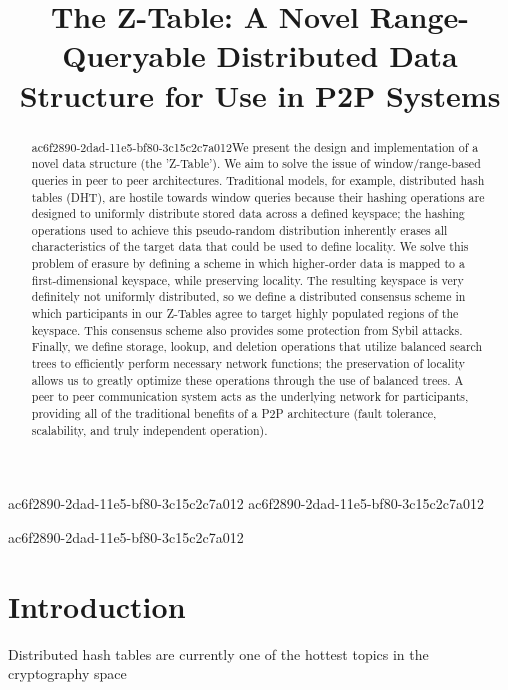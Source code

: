 \documentclass[12pt]{article}
\title{The Z-Table: A Novel Range-Queryable Distributed Data Structure for Use in P2P Systems}
\begin{document}
ac6f2890-2dad-11e5-bf80-3c15c2c7a012
ac6f2890-2dad-11e5-bf80-3c15c2c7a012\maketitle
ac6f2890-2dad-11e5-bf80-3c15c2c7a012
\begin{abstract}
ac6f2890-2dad-11e5-bf80-3c15c2c7a012We present the design and implementation of a novel data structure (the 'Z-Table'). We aim to solve the issue of window/range-based queries in peer to peer architectures. Traditional models, for example,  distributed hash tables (DHT), are hostile towards window queries because their hashing operations are designed to uniformly distribute stored data across a defined keyspace; the hashing operations used to achieve this pseudo-random distribution inherently erases all characteristics of the target data that could be used to define locality. We solve this problem of erasure by defining a scheme in which higher-order data is mapped to a first-dimensional keyspace, while preserving locality. The resulting keyspace is very definitely not uniformly distributed, so we define a distributed consensus scheme in which participants in our Z-Tables agree to target highly populated regions of the keyspace. This consensus scheme also provides some protection from Sybil attacks. Finally, we define storage, lookup, and deletion operations that utilize balanced search trees to efficiently perform necessary network functions; the preservation of locality allows us to greatly optimize these operations through the use of balanced trees. A peer to peer communication system acts as the underlying network for participants, providing all of the traditional benefits of a P2P architecture (fault tolerance, scalability, and truly independent operation).
\end{abstract}


\newpage
\section{Introduction}
Distributed hash tables are currently one of the hottest topics in the cryptography space~\cite{Stoica:2001dj,Rowstron:2001ea,Ratnasamy:2001wn}

\printbibliography
\end{document}
